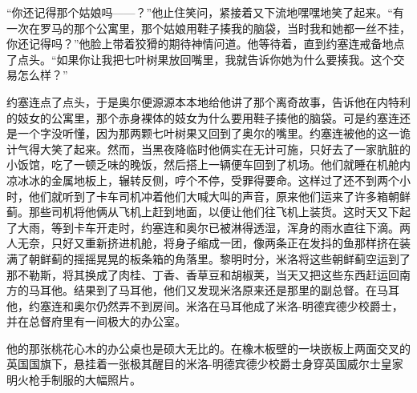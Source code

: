     “你还记得那个姑娘吗——？”他止住笑问，紧接着又下流地嘿嘿地笑了起来。“有一次在罗马的那个公寓里，那个姑娘用鞋子揍我的脑袋，当时我和她都一丝不挂，你还记得吗？”他脸上带着狡猾的期待神情问道。他等待着，直到约塞连戒备地点了点头。“如果你让我把七叶树果放回嘴里，我就告诉你她为什么要揍我。这个交易怎么样？”

    约塞连点了点头，于是奥尔便源源本本地给他讲了那个离奇故事，告诉他在内特利的妓女的公寓里，那个赤身裸体的妓女为什么要用鞋子揍他的脑袋。可是约塞连还是一个字没听懂，因为那两颗七叶树果又回到了奥尔的嘴里。约塞连被他的这一诡计气得大笑了起来。然而，当黑夜降临时他俩实在无计可施，只好去了一家肮脏的小饭馆，吃了一顿乏味的晚饭，然后搭上一辆便车回到了机场。他们就睡在机舱内凉冰冰的金属地板上，辗转反侧，哼个不停，受罪得要命。这样过了还不到两个小时，他们就听到了卡车司机冲着他们大喊大叫的声音，原来他们运来了许多箱朝鲜蓟。那些司机将他俩从飞机上赶到地面，以便让他们往飞机上装货。这时天又下起了大雨，等到卡车开走时，约塞连和奥尔已被淋得透湿，浑身的雨水直往下滴。两人无奈，只好又重新挤进机舱，将身子缩成一团，像两条正在发抖的鱼那样挤在装满了朝鲜蓟的摇摇晃晃的板条箱的角落里。黎明时分，米洛将这些朝鲜蓟空运到了那不勒斯，将其换成了肉桂、丁香、香草豆和胡椒荚，当天又把这些东西赶运回南方的马耳他。结果到了马耳他，他们又发现米洛原来还是那里的副总督。在马耳他，约塞连和奥尔仍然弄不到房间。米洛在马耳他成了米洛-明德宾德少校爵士，并在总督府里有一间极大的办公室。

    他的那张桃花心木的办公桌也是硕大无比的。在橡木板壁的一块嵌板上两面交叉的英国国旗下，悬挂着一张极其醒目的米洛-明德宾德少校爵士身穿英国威尔士皇家明火枪手制服的大幅照片。

